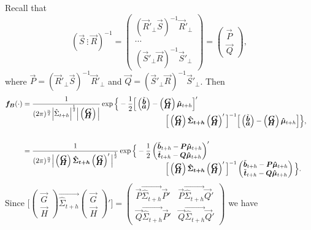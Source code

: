 \documentclass[graybox]{svmult}
\def\ba{\begin{pmatrix}\tilde{\vec{b}}\\[-0.2cm]\tilde{\vec{a}}\end{pmatrix}}
\def\GH{\begin{pmatrix}\vec{G}\\[-0.2cm]\vec{H}\end{pmatrix}}
\begin{document}
Recall that
$$
(\vec{S} ~ \vdots~ \vec{R})^{-1} =
\begin{pmatrix}(\vec{R}'_\bot \vec{S})^{-1}\vec{R}'_\bot \\ \cdots \\ (\vec{S}'_\bot \vec{R})^{-1}\vec{S}'_\bot \end{pmatrix} =
\begin{pmatrix}
\vec{P} \\\vec{Q}
\end{pmatrix},
$$
where $\vec{P}=(\vec{R}'_\bot \vec{S})^{-1}\vec{R}'_\bot$ and $\vec{Q}=(\vec{S}'_\bot \vec{R})^{-1}\vec{S}'_\bot$. Then
\begin{align*}
\vec{f_B}(\cdot)& =\frac{1}{(2\pi)^{\frac{n}{2}}\Big|\hat{\Sigma}_{t+h}\Big|^{\frac{1}{2}}\Big|\GH \Big|}
\exp \Big\{-\frac{1}{2}\Big[\ba-\GH\vec{\hat{\mu}}_{t+h}\Big]'\\[-0.5cm]
& \hspace*{7cm}
\Big[\GH\vec{\hat{\Sigma}_{t+h}}\GH'\Big]^{-1}\Big[\ba-\GH\vec{\hat{\mu}}_{t+h}\Big] \Big\},\\[0.5cm]
& =\frac{1}{(2\pi)^{\frac{n}{2}}\Big|\GH\vec{\hat{\Sigma}_{t+h}}\GH'\Big|^{\frac{1}{2}}}
\exp \Big\{-\frac{1}{2} \begin{pmatrix}\tilde{\vec{b}}_{t+h} - \vec{P}\vec{\hat{\mu}}_{t+h}\\ \tilde{\vec{t}}_{t+h}- \vec{Q}\vec{\hat{\mu}}_{t+h}\end{pmatrix}' &\\[-0.5cm]
& \hspace*{7cm}
\Big[\GH\vec{\hat{\Sigma}_{t+h}}\GH'\Big]^{-1}\begin{pmatrix}\tilde{\vec{b}}_{t+h} - \vec{P}\vec{\hat{\mu}}_{t+h}\\ \tilde{\vec{t}}_{t+h}- \vec{Q}\vec{\hat{\mu}}_{t+h}\end{pmatrix} \Big\}.
\end{align*}
Since $\Big[\GH\vec{\hat{\Sigma}_{t+h}}\GH'\Big] = \begin{pmatrix}
\vec{P}\vec{\hat{\Sigma}_{t+h}}\vec{P}' & \vec{P}\vec{\hat{\Sigma}_{t+h}}\vec{Q}' \\
\vec{Q}\vec{\hat{\Sigma}_{t+h}}\vec{P}' & \vec{Q}\vec{\hat{\Sigma}_{t+h}}\vec{Q}'
\end{pmatrix}$ we have
\end{document}
